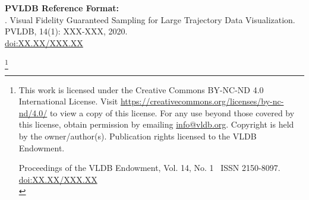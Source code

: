 \documentclass[sigconf, nonacm]{acmart}
\newcommand\vldbdoi{XX.XX/XXX.XX}
\newcommand\vldbpages{XXX-XXX}
\newcommand\vldbvolume{14}
\newcommand\vldbissue{1}
\newcommand\vldbyear{2020}
\newcommand{\trim}{\vspace{-2mm}}
\begin{document}
\maketitle


\trim


\begingroup\small\noindent\raggedright\textbf{PVLDB Reference Format:}\\
\shortauthors. Visual Fidelity Guaranteed Sampling for Large Trajectory Data Visualization. PVLDB, \vldbvolume(\vldbissue): \vldbpages, \vldbyear.\\
\href{https://doi.org/\vldbdoi}{doi:\vldbdoi}
\endgroup

\trim \trim \trim

\begingroup
\renewcommand\thefootnote{}\footnote{\noindent
This work is licensed under the Creative Commons BY-NC-ND 4.0 International License. Visit \url{https://creativecommons.org/licenses/by-nc-nd/4.0/} to view a copy of this license. For any use beyond those covered by this license, obtain permission by emailing \href{mailto:info@vldb.org}{info@vldb.org}. Copyright is held by the owner/author(s). Publication rights licensed to the VLDB Endowment. \\
\raggedright Proceedings of the VLDB Endowment, Vol. \vldbvolume, No. \vldbissue\ %
ISSN 2150-8097. \\
\href{https://doi.org/\vldbdoi}{doi:\vldbdoi} \\
}\addtocounter{footnote}{-1}\endgroup



















\end{document}
